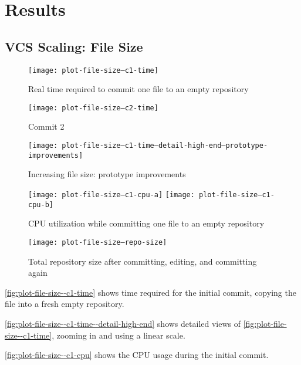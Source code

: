 \chapter{Results}

\section{VCS Scaling: File Size}

\begin{figure}[]
  \caption{Real time required to commit one file to an empty repository}
  \label{fig:plot-file-size--c1-time}
  \centering
    \texttt{[image: plot-file-size--c1-time]}
\end{figure}

\begin{figure}[]
  \caption{Commit 2}
  \label{fig:plot-file-size--c2-time}
  \centering
    \texttt{[image: plot-file-size--c2-time]}
\end{figure}

\begin{figure}[]
  \caption{Increasing file size: prototype improvements}
  \label{fig:plot-file-size--c1-time--prototype-improvements}
  \centering
    \texttt{[image: plot-file-size--c1-time--detail-high-end--prototype-improvements]}
\end{figure}

\begin{figure}[]
  \caption{CPU utilization while committing one file to an empty repository}
  \label{fig:plot-file-size--c1-cpu}
  \centering
    \texttt{[image: plot-file-size--c1-cpu-a]}
    \texttt{[image: plot-file-size--c1-cpu-b]}
\end{figure}

\begin{figure}[]
  \caption{Total repository size after committing, editing, and committing again}
  \label{fig:plot-file-size--repo-size}
  \centering
    \texttt{[image: plot-file-size--repo-size]}
\end{figure}

\autoref{fig:plot-file-size--c1-time} shows time required for
the initial commit, copying the file into a fresh empty repository.

\autoref{fig:plot-file-size--c1-time--detail-high-end} shows
detailed views of \autoref{fig:plot-file-size--c1-time}, zooming
in and using a linear scale.

\autoref{fig:plot-file-size--c1-cpu} shows the
CPU usage during the initial commit.

